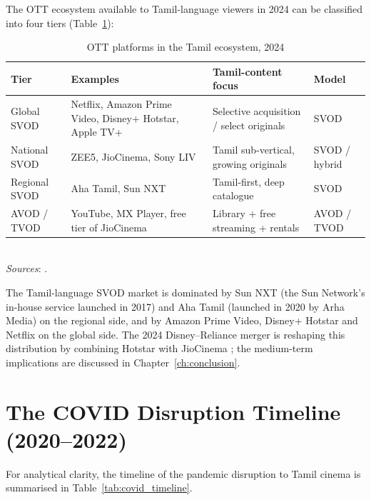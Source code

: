 The OTT ecosystem available to Tamil-language viewers in 2024 can
be classified into four tiers (Table~\ref{tab:ott_ecosystem}):

\begin{table}[h]
\centering
\caption{OTT platforms in the Tamil ecosystem, 2024}
\label{tab:ott_ecosystem}
\small
\begin{tabular}{p{3.6cm} p{3.6cm} p{3.6cm} p{2.6cm}}
\toprule
\textbf{Tier} & \textbf{Examples} & \textbf{Tamil-content focus} & \textbf{Model}\\
\midrule
Global SVOD     & Netflix, Amazon Prime Video, Disney+ Hotstar, Apple TV+ & Selective acquisition / select originals & SVOD \\
National SVOD   & ZEE5, JioCinema, Sony LIV  & Tamil sub-vertical, growing originals & SVOD / hybrid \\
Regional SVOD   & Aha Tamil, Sun NXT          & Tamil-first, deep catalogue              & SVOD \\
AVOD / TVOD     & YouTube, MX Player, free tier of JioCinema & Library + free streaming + rentals & AVOD / TVOD \\
\bottomrule
\end{tabular}
\\\smallskip
\textit{Sources}: \citet{ficciey2024,kpmg2023,statista2024,
aha2022launchreport,mpa2024}.
\end{table}

The Tamil-language SVOD market is dominated by Sun NXT (the Sun
Network's in-house service launched in 2017) and Aha Tamil
(launched in 2020 by Arha Media) on the regional side, and by
Amazon Prime Video, Disney+ Hotstar and Netflix on the global side.
The 2024 Disney--Reliance merger is reshaping this distribution by
combining Hotstar with JioCinema \citep{economictimes2024jiomerger,
thehindu2024merger}; the medium-term implications are discussed in
Chapter~\ref{ch:conclusion}.

\section{The COVID Disruption Timeline (2020--2022)}
\label{sec:covid_timeline}

For analytical clarity, the timeline of the pandemic disruption to
Tamil cinema is summarised in Table~\ref{tab:covid_timeline}.

